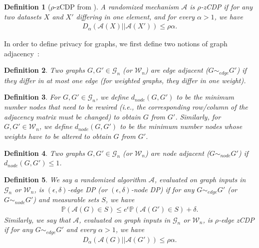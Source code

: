 \documentclass{article}
\newtheorem{definition}{Definition}
\begin{document}
\begin{definition}[$\rho$-zCDP from \cite{bun2016conc}]
A randomized mechanism $\mathcal{A}$ is $\rho$-zCDP if for any two datasets $X$ and $X'$ differing in one element, and for every $\alpha > 1$, we have
\begin{align*}
D_\alpha\left(\mathcal{A}(X)||\mathcal{A}(X')\right) \leq \rho\alpha.
\end{align*}
\end{definition}

In order to define privacy for graphs, we first define two notions of graph adjacency~\cite{kasiviswanathan2013analyzing}:

\begin{definition}
Two graphs $G, G' \in \mathcal{G}_n$ (or $ \mathcal{W}_n$) are edge adjacent ($G \sim_{edge} G'$) if they differ in at most one edge (for weighted graphs, they differ in one weight).
\end{definition}

\begin{definition}
For $G, G' \in \mathcal{G}_n$, we define $d_{node}(G, G')$ to be the minimum number nodes that need to be rewired (i.e., the corresponding row/column of the adjacency matrix must be changed) to obtain $G$ from $G'$. Similarly, for $G, G' \in \mathcal{W}_n$, we define $d_{node}(G, G')$ to be the minimum number nodes whose weights have to be altered to obtain $G$ from $G'$.
\end{definition}

\begin{definition}
Two graphs $G, G' \in \mathcal{G}_n$ (or $ \mathcal{W}_n$) are node adjacent ($G \sim_{node} G'$) if $d_{node}(G, G') \leq 1$.
\end{definition}

\begin{definition}
We say a randomized algorithm $\mathcal{A}$, evaluated on graph inputs in $\mathcal{G}_n$ or $\mathcal{W}_n$, is $(\epsilon, \delta)$-edge DP (or $(\epsilon, \delta)$-node DP) if for any $G \sim_{edge} G'$ (or $G \sim_{node} G'$) and measurable sets $S$, we have
\begin{align*}
\mathbb{P}(\mathcal{A}(G) \in S) \leq e^{\epsilon}\mathbb{P}(\mathcal{A}(G') \in S) + \delta.
\end{align*}
Similarly, we say that $\mathcal{A}$, evaluated on graph inputs in $\mathcal{G}_n$ or $\mathcal{W}_n$, is $\rho$-edge zCDP if for any $G \sim_{edge} G'$ and every $\alpha > 1$, we have
\begin{align*}
D_\alpha\left(\mathcal{A}(G)||\mathcal{A}(G')\right) \leq \rho\alpha.
\end{align*}
\end{definition}
\end{document}
